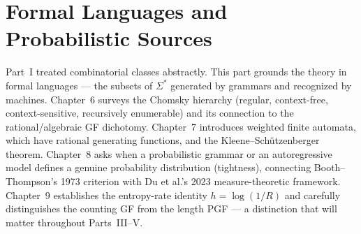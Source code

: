 \part{Formal Languages and Probabilistic Sources}

Part~I treated combinatorial classes abstractly. This part grounds the theory in formal languages --- the subsets of $\Sigma^*$ generated by grammars and recognized by machines. Chapter~6 surveys the Chomsky hierarchy (regular, context-free, context-sensitive, recursively enumerable) and its connection to the rational/algebraic GF dichotomy. Chapter~7 introduces weighted finite automata, which have rational generating functions, and the Kleene--Sch\"utzenberger theorem. Chapter~8 asks when a probabilistic grammar or an autoregressive model defines a genuine probability distribution (tightness), connecting Booth--Thompson's 1973 criterion with Du et al.'s 2023 measure-theoretic framework. Chapter~9 establishes the entropy-rate identity $h = \log(1/R)$ and carefully distinguishes the counting GF from the length PGF --- a distinction that will matter throughout Parts~III--V.





